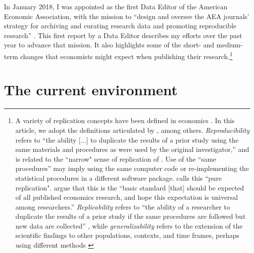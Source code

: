 \documentclass[AEJ]{AEA}
\begin{document}
In January 2018, I was appointed as the first Data Editor of the American Economic Association, with the mission to ``design  and  oversee  the  AEA  journals’  strategy for archiving and curating research data and promoting  reproducible  research'' \citep{10.1257/pandp.108.745}. This first report by a Data Editor describes my efforts over the past year to advance  that mission. It also highlights some of the short- and medium-term changes that economists might expect when publishing their research.\footnote{A variety of replication concepts have been defined in economics \citep{HamermeshCan.J.Econ.2007,ClemensJ.Econ.Surv.2017}. In this article, we adopt the definitions articulated by \citet{Bollen2015-vb}, among others. \textit{Reproducibility}  refers to ``the ability [$\dots$] to duplicate the results of a prior study using the same materials and procedures as were used by the original investigator,'' and is related to the ``narrow" sense of replication of \cite{PesaranJ.Appl.Econom.2003}. Use of the ``same procedures'' may imply using the same computer code or re-implementing the statistical procedures in a different software package. \cite{HamermeshCan.J.Econ.2007} calls this ``pure replication". \citet[p. 942]{ChristensenTransparencyReproducibilityCredibility2018} argue that this is the ``basic standard [that] should be expected of all published economics research, and hope this expectation is universal among researchers.'' \textit{Replicability} refers to ``the ability of a researcher to duplicate the results of a prior study if the same procedures are followed but new data are collected'' \citep[ ``wider'' sense of replication]{PesaranJ.Appl.Econom.2003}, while \textit{generalizability} refers to the extension of the scientific findings to other populations, contexts, and time frames, perhaps using different methods \citep[ ``scientific replication'']{Hamermesh2017-kq}}


\section{The current environment}
\end{document}
